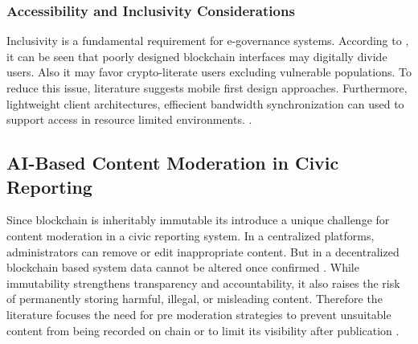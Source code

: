 
\subsubsection{Accessibility and Inclusivity Considerations}

Inclusivity is a fundamental requirement for e-governance systems. According to \cite{bertrand2023connected}, it can be seen that poorly designed blockchain interfaces may digitally divide users. Also it may favor crypto-literate users excluding vulnerable populations. To reduce this issue, literature suggests mobile first design approaches. Furthermore, lightweight client architectures, effiecient bandwidth synchronization can used to support access in resource limited environments.  \cite{shahin2025towards}.  



\subsection{AI-Based Content Moderation in Civic Reporting}

Since blockchain is inheritably immutable its introduce a unique challenge for content moderation in a civic reporting system. In a centralized platforms, administrators can remove or edit inappropriate content. But in a decentralized blockchain based system data cannot be altered once confirmed \cite{tencentcloud2025moderation}. While immutability strengthens transparency and accountability, it also raises the risk of permanently storing harmful, illegal, or misleading content. Therefore the literature focuses the need for pre moderation strategies to prevent unsuitable content from being recorded on chain or to limit its visibility after publication \cite{dzone2026blockchainai}.

